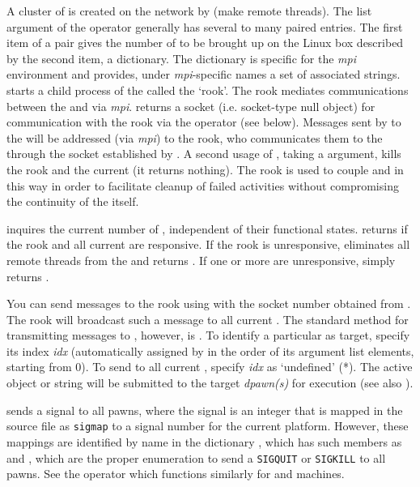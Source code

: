 A cluster of  is created on the network by
 (make remote threads). The list argument of the
operator generally has several to many paired entries. The first item
of a pair gives the number of  to be brought up
on the Linux box described by the second item, a dictionary. The
dictionary is specific for the \emph{mpi} environment and provides,
under \emph{mpi}-specific names a set of associated
strings.  starts a child process of the 
called the `rook'. The rook mediates communications between the
 and  via
\emph{mpi}.  returns a socket (i.e. socket-type null
object) for communication with the rook via the  operator
 (see below). Messages sent by  to the
 will be addressed (via \emph{mpi}) to the rook, who
communicates them to the  through the socket established
by . A second usage of , taking a
 argument, kills the rook and the current
 (it returns nothing). The rook is used to couple
 and  in this way in order to
facilitate cleanup of failed  activities without
compromising the continuity of the  itself.

 inquires the current number of ,
independent of their functional states.  returns
 if the rook and all current  are
responsive. If the rook is unresponsive,  eliminates
all remote threads from the  and returns . If
one or more  are unresponsive, 
simply returns .

You can send messages to the rook using  with the socket
number obtained from . The rook will broadcast such a
message to all current . The standard method for
transmitting messages to , however, is
. To identify a particular  as target, specify
its index \emph{idx} (automatically assigned by  in
the order of its argument list elements, starting from 0). To send to
all current , specify \emph{idx} as `undefined'
(*). The active object or string will be submitted to the target
\emph{dpawn(s)} for execution (see also ).

 sends a signal to all pawns, where the signal is an
integer that is mapped in the source file  as
\texttt{sigmap} to a signal number for the current platform. However,
these mappings are identified by name in the dictionary
, which has such members as  and
, which are the proper enumeration to send a
\texttt{SIGQUIT} or \texttt{SIGKILL} to all pawns. See the
 operator which functions similarly for  and
 machines.


